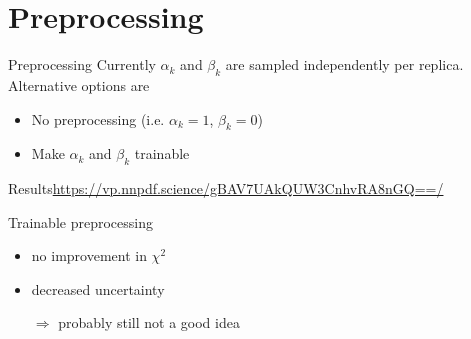 \documentclass[aspectratio=169, 8pt,t]{beamer}
\begin{document}
\section*{Preprocessing}

\begin{frame}{Preprocessing}
  Currently $\alpha_k$ and $\beta_k$ are sampled independently per replica. \\
  Alternative options are
  \begin{itemize}
    \item No preprocessing (i.e. $\alpha_k=1$, $\beta_k=0$)
    \item Make $\alpha_k$ and $\beta_k$ trainable
  \end{itemize}
\end{frame}


\begin{frame}{Results}{\url{https://vp.nnpdf.science/gBAV7UAkQUW3CnhvRA8nGQ==/}}

  Trainable preprocessing
  \begin{itemize}
    \item no improvement in $\chi^2$
    \item decreased uncertainty
    \item[$\Rightarrow$] probably still not a good idea
  \end{itemize}


\end{frame}
\end{document}
